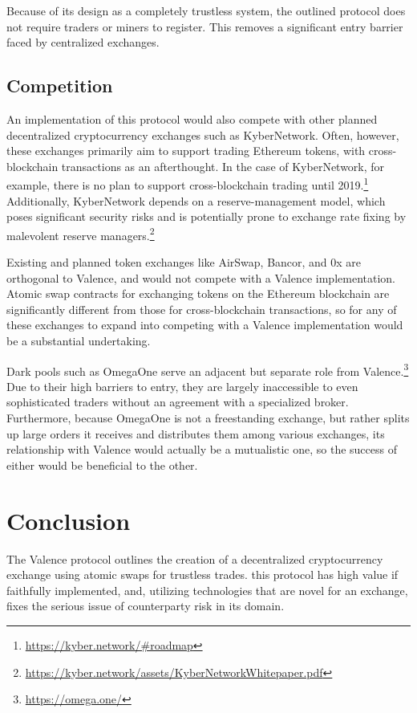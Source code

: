 \documentclass[a4paper]{article}
\begin{document}
    Because of its design as a completely trustless system, the outlined
    protocol does not require traders or miners to register. This removes a
    significant entry barrier faced by centralized exchanges.
  \subsection*{Competition}
    An implementation of this protocol would also compete with other planned decentralized cryptocurrency exchanges such as KyberNetwork. Often, however, these exchanges primarily aim to support trading Ethereum tokens, with cross-blockchain transactions as an afterthought. In the case of KyberNetwork, for example, there is no plan to support cross-blockchain trading until 2019.\footnote[7]{\url{https://kyber.network/\#roadmap}} Additionally, KyberNetwork depends on a reserve-management model, which poses significant security risks and is potentially prone to exchange rate fixing by malevolent reserve managers.\footnote[8]
        {\url{https://kyber.network/assets/KyberNetworkWhitepaper.pdf}}

    Existing and planned token exchanges like AirSwap, Bancor, and 0x are orthogonal to Valence, and would not compete with a Valence implementation. Atomic swap contracts for exchanging tokens on the Ethereum blockchain are significantly different from those for cross-blockchain transactions, so for any of these exchanges to expand into competing with a Valence implementation would be a substantial undertaking.

    Dark pools such as OmegaOne serve an adjacent but separate role from Valence.\footnote[9]
    {\url{https://omega.one/}} Due to their high barriers to entry, they are largely inaccessible to even sophisticated traders without an agreement with a specialized broker. Furthermore, because OmegaOne is not a freestanding exchange, but rather splits up large orders it receives and distributes them among various exchanges, its relationship with Valence would actually be a mutualistic one, so the success of either would be beneficial to the other.

\section*{Conclusion}
	The Valence protocol outlines the creation of a
    decentralized
    cryptocurrency exchange using atomic swaps for trustless trades.
    this protocol has high value if
    faithfully implemented, and, utilizing technologies that are
    novel for an exchange, fixes the serious issue of
    counterparty risk in its domain.
\end{document}
